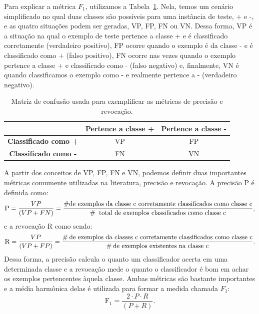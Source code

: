Para explicar a métrica $F_1$, utilizamos a Tabela~\ref{table::confusao}. Nela, temos um cenário simplificado no qual duas classes são possíveis para uma instância de teste, + e -, e as quatro situações podem ser geradas, VP, FP, FN ou VN. Dessa forma, VP é a situação na qual o exemplo de teste pertence a classe + e é classificado corretamente (verdadeiro positivo), FP ocorre quando o exemplo é da classe - e é classificado como + (falso positivo), FN ocorre nas vezes quando o exemplo pertence a classe + e classificado como - (falso negativo) e, finalmente, VN é quando classificamos o exemplo como - e realmente pertence a - (verdadeiro negativo).


\begin{table}[ht*]
\centering
\begin{tabular}{|c|c|c|}
\toprule
       &    \textbf{Pertence a classe +} & \textbf{Pertence a classe -} \\
\midrule
    \textbf{Classificado como +}  & VP & FP \tabularnewline \hline
    \textbf{Classificado como -}  & FN & VN \tabularnewline
\bottomrule
\end{tabular}
\caption{Matriz de confusão usada para exemplificar as métricas de precisão e revocação.}
\label{table::confusao}
\end{table}

A partir dos conceitos de VP, FP, FN e VN, podemos definir duas importantes métricas comumente utilizadas na literatura, precisão e revocação. A precisão \textsc{P} é definida como:
\begin{equation}
\textsc{P} = \frac{VP}{(VP+FN)} = \frac{\# \text{de exemplos da classe c corretamente classificados como classe c}} {\# \: \text{ total de exemplos classificados como classe c}} \\,
\end{equation}
e a revocação \textsc{R} como sendo:
\begin{equation}
\textsc{R} = \frac{VP}{(VP+FP)} = \frac{\# \: \text{de exemplos da classes c corretamente classificados como classe c}}{\# \: \text{de exemplos existentes na classe c}}.
\end{equation}
Dessa forma, a precisão calcula o quanto um classificador acerta em uma determinada classe e a revocação mede o quanto o classificador é bom em achar os exemplos pertencentes àquela classe.
Ambas métricas são bastante importantes e a média harmônica delas é utilizada para formar a medida chamada $F_1$:
\begin{equation}
\text{F}_1 = \frac{2 \cdot P \cdot R}{(P + R)}.
\end{equation}

